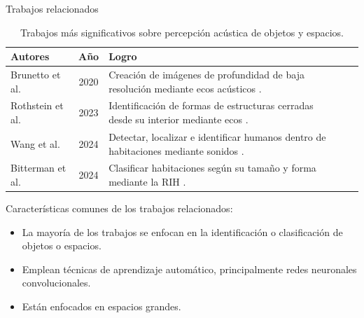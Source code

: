 \documentclass[aspectratio=169]{beamer}
\begin{document}
\begin{frame}{Trabajos relacionados}
   \vspace*{-0.8cm}
\scriptsize
\begin{table}
\begin{center}
\begin{tabular}{|>{\centering\arraybackslash}m{2cm}|c|>{\centering\arraybackslash}m{6cm}|m{1.4cm}|c|}
    \hline
    Autores & A\~no& Logro \\ 
    \hline
    Brunetto et al. & 2020 & Creación de imágenes de profundidad de baja resolución mediante ecos acústicos \cite{bat1}.\\
    \hline
    Rothstein et al. & 2023 & Identificación de formas de estructuras cerradas desde su interior mediante ecos \cite{echosense}. \\
    \hline 
    Wang et al.	& 2024 & Detectar, localizar e identificar humanos dentro de habitaciones mediante sonidos \cite{RIR09}.\\
    \hline
    Bitterman et al. & 2024 & Clasificar habitaciones según su tamaño y forma mediante la RIH \cite{RIR06}.\\
    \hline

\end{tabular}
\end{center}
\caption{Trabajos más significativos sobre percepción acústica de objetos y espacios.}
\label{table:1}
\end{table}

   \vspace*{-0.2cm}

Características comunes de los trabajos relacionados:
\vspace*{0.1cm}
\begin{itemize}
\item La mayoría de los trabajos se enfocan en la identificación o clasificación de objetos o espacios.
\item Emplean técnicas de aprendizaje automático, principalmente redes neuronales convolucionales.
\item Están enfocados en espacios grandes.
\end{itemize}



\end{frame}
\end{document}
